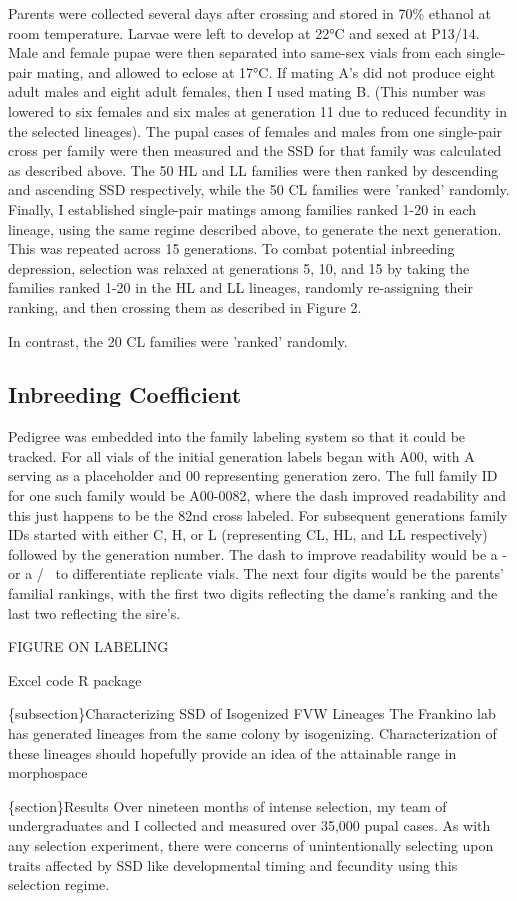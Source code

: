 \documentclass[
  11pt,
]{article}
\begin{document}
Parents were collected several days after crossing and stored
in 70\% ethanol at room temperature. Larvae were left to develop at
22\si{\celsius} and sexed at P13/14. Male and female pupae were then
separated into same-sex vials from each single-pair mating, and allowed
to eclose at 17\si{\celsius}. If mating A's did not
produce eight adult males and eight adult females, then I used mating B. (This
number was lowered to six females and six males at generation 11 due to
reduced fecundity in the selected lineages). The pupal cases of females
and males from one single-pair cross per family were then measured and
the SSD for that family was calculated as described above. The 50 HL and
LL families were then ranked by descending and ascending SSD
respectively, while the 50 CL families were 'ranked' randomly.
Finally, I established single-pair matings among families ranked 1-20 in
each lineage, using the same regime described above, to generate the
next generation. This was repeated across 15 generations. To combat
potential inbreeding depression, selection was relaxed at generations 5,
10, and 15 by taking the families ranked 1-20 in the HL and LL lineages,
randomly re-assigning their ranking, and then crossing them as described
in Figure 2. 

In
contrast, the 20 CL families were 'ranked' randomly.

\subsection{Inbreeding Coefficient} 
Pedigree was embedded into the family labeling system so that it could be tracked. For all vials of the initial generation labels began with A00, with A serving as a placeholder and 00 representing generation zero. The full family ID for one such family would be A00-0082, where the dash improved readability and this just happens to be the 82nd cross labeled. For subsequent generations family IDs started with either C, H, or L (representing CL, HL, and LL respectively) followed by the generation number. The dash to improve readability would be a - or a /~ to differentiate replicate vials. The next four digits would be the parents' familial rankings, with the first two digits reflecting the dame's ranking and the last two reflecting the sire's. 

FIGURE ON LABELING

Excel code R package

\{subsection\}Characterizing SSD of Isogenized FVW Lineages
The Frankino lab has generated lineages from the same colony by isogenizing. Characterization of these lineages should hopefully provide an idea of the attainable range in morphospace

\{section\}Results 
Over nineteen months of intense selection, my team of
undergraduates and I collected and measured over 35,000 pupal cases. As
with any selection experiment, there were concerns of unintentionally
selecting upon traits affected by SSD like developmental timing and
fecundity using this selection regime.


\end{document}

